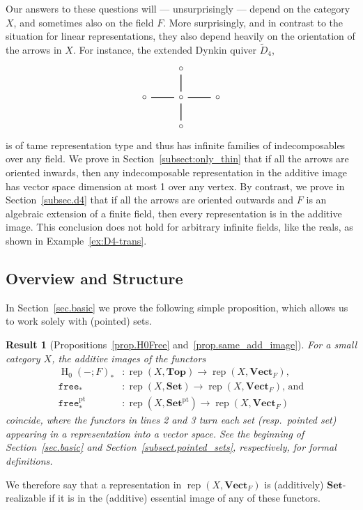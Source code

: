 \documentclass[a4paper]{amsart}
\theoremstyle{plain}
\newtheorem{resultx}{Result}
\theoremstyle{definition}
\theoremstyle{remark}
\newcommand{\funct}[1]{\operatorname{\mathtt{#1}}}
\newcommand{\Top}{\mathbf{Top}}
\newcommand{\Set}{\mathbf{Set}}
\newcommand{\pSet}{\mathbf{Set}^\mathrm{pt}}
\newcommand{\VectF}{\mathbf{Vect}_F}
\DeclareMathOperator{\rep}{rep}
\begin{document}
Our answers to these questions will --- unsurprisingly --- depend on the category \( X \), and sometimes also on the field $F$. More surprisingly, and in contrast to the situation for linear representations, they also depend heavily on the orientation of the arrows in \( X \). For instance, the extended Dynkin quiver $\tilde D_4$,
\[
\begin{tikzcd}
& \circ & \\
\circ \ar[r,-,thick] & \circ \ar[u, -, thick] \ar[d, -, thick] & \ar[l, -, thick] \circ \\
& \circ & 
\end{tikzcd}
\]
 is of tame representation type and thus has infinite families of indecomposables over any field. We prove in Section~\ref{subsect:only_thin} that if all the arrows are oriented inwards, then any indecomposable representation in the additive image has vector space dimension at most 1 over any vertex. By contrast, we prove in Section~\ref{subsec.d4} that if all the arrows are oriented outwards and $F$ is an algebraic extension of a finite field, then every representation is in the additive image. This conclusion does not hold for arbitrary infinite fields, like the reals, as shown in Example~\ref{ex:D4-trans}. 

\subsection{Overview and Structure}
In Section~\ref{sec.basic} we prove the following simple proposition, which allows us to work solely with (pointed) sets. 
\begin{resultx}[Propositions~\ref{prop.H0Free} and~\ref{prop.same_add_image}]
For a small category \( X \), the additive images of the functors 
\begin{align*}
\operatorname{H}_0(-;F)_* & \colon \rep(X, \Top) \to \rep(X, \VectF) \text{,} \\
\funct{free}_* & \colon \rep(X, \Set) \to \rep(X, \VectF) \text{, and} \\
\funct{free}^\mathrm{pt}_* & \colon \rep(X, \pSet) \to \rep(X, \VectF)
\end{align*}
coincide, where the functors in lines 2 and 3 turn each set (resp.\ pointed set) appearing in a representation into a vector space. See the beginning of Section~\ref{sec.basic} and Section~\ref{subsect.pointed_sets}, respectively, for formal definitions.
\end{resultx}
We therefore say that a representation in $\rep(X, \VectF)$ is (additively) $\Set$-realizable if it is in the (additive) essential image of any of these functors. 
\end{document}
